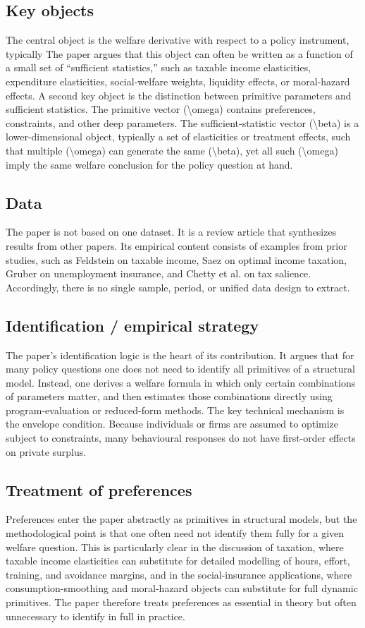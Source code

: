 \documentclass[11pt,a4paper]{article}
\begin{document}
\subsection*{Key objects}
The central object is the welfare derivative with respect to a policy instrument, typically The paper argues that this object can often be written as a function of a small set of “sufficient statistics,” such as taxable income elasticities, expenditure elasticities, social-welfare weights, liquidity effects, or moral-hazard effects. A second key object is the distinction between primitive parameters and sufficient statistics. The primitive vector (\textbackslash{}omega) contains preferences, constraints, and other deep parameters. The sufficient-statistic vector (\textbackslash{}beta) is a lower-dimensional object, typically a set of elasticities or treatment effects, such that multiple (\textbackslash{}omega) can generate the same (\textbackslash{}beta), yet all such (\textbackslash{}omega) imply the same welfare conclusion for the policy question at hand.

\subsection*{Data}
The paper is not based on one dataset. It is a review article that synthesizes results from other papers. Its empirical content consists of examples from prior studies, such as Feldstein on taxable income, Saez on optimal income taxation, Gruber on unemployment insurance, and Chetty et al. on tax salience. Accordingly, there is no single sample, period, or unified data design to extract.

\subsection*{Identification / empirical strategy}
The paper’s identification logic is the heart of its contribution. It argues that for many policy questions one does not need to identify all primitives of a structural model. Instead, one derives a welfare formula in which only certain combinations of parameters matter, and then estimates those combinations directly using program-evaluation or reduced-form methods. The key technical mechanism is the envelope condition. Because individuals or firms are assumed to optimize subject to constraints, many behavioural responses do not have first-order effects on private surplus.

\subsection*{Treatment of preferences}
Preferences enter the paper abstractly as primitives in structural models, but the methodological point is that one often need not identify them fully for a given welfare question. This is particularly clear in the discussion of taxation, where taxable income elasticities can substitute for detailed modelling of hours, effort, training, and avoidance margins, and in the social-insurance applications, where consumption-smoothing and moral-hazard objects can substitute for full dynamic primitives. The paper therefore treats preferences as essential in theory but often unnecessary to identify in full in practice.
\end{document}
